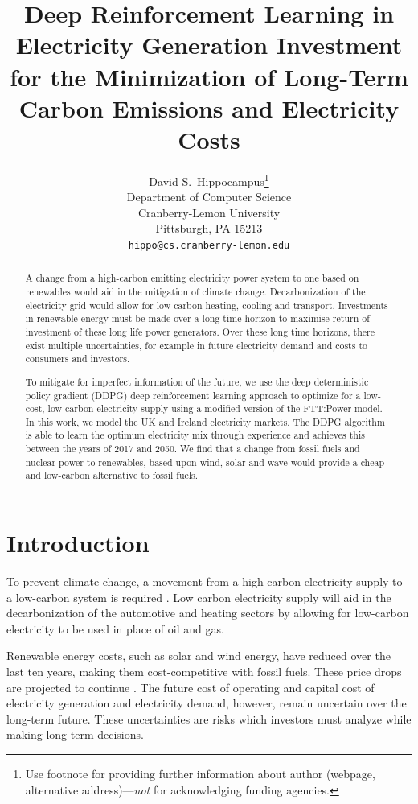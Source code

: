 \documentclass{article}
\title{Deep Reinforcement Learning in Electricity Generation Investment for the Minimization of Long-Term Carbon Emissions and Electricity Costs}
\author{%
  David S.~Hippocampus\thanks{Use footnote for providing further information
    about author (webpage, alternative address)---\emph{not} for acknowledging
    funding agencies.} \\
  Department of Computer Science\\
  Cranberry-Lemon University\\
  Pittsburgh, PA 15213 \\
  \texttt{hippo@cs.cranberry-lemon.edu} \\
}
\begin{document}
\maketitle

\begin{abstract}

A change from a high-carbon emitting electricity power system to one based on renewables would aid in the mitigation of climate change. Decarbonization of the electricity grid would allow for low-carbon heating, cooling and transport. Investments in renewable energy must be made over a long time horizon to maximise return of investment of these long life power generators. Over these long time horizons, there exist multiple uncertainties, for example in future electricity demand and costs to consumers and investors. 

To mitigate for imperfect information of the future, we use the deep deterministic policy gradient (DDPG) deep reinforcement learning approach to optimize for a low-cost, low-carbon electricity supply using a modified version of the FTT:Power model. In this work, we model the UK and Ireland electricity markets. The DDPG algorithm is able to learn the optimum electricity mix through experience and achieves this between the years of 2017 and 2050. We find that a change from fossil fuels and nuclear power to renewables, based upon wind, solar and wave would provide a cheap and low-carbon alternative to fossil fuels.

\end{abstract}




\section{Introduction}
\label{sec:intro}


To prevent climate change, a movement from a high carbon electricity supply to a low-carbon system is required \cite{Kell2020}. Low carbon electricity supply will aid in the decarbonization of the automotive and heating sectors by allowing for low-carbon electricity to be used in place of oil and gas.

Renewable energy costs, such as solar and wind energy, have reduced over the last ten years, making them cost-competitive with fossil fuels. These price drops are projected to continue \cite{IEA2015}. The future cost of operating and capital cost of electricity generation and electricity demand, however, remain uncertain over the long-term future. These uncertainties are risks which investors must analyze while making long-term decisions.
\end{document}
